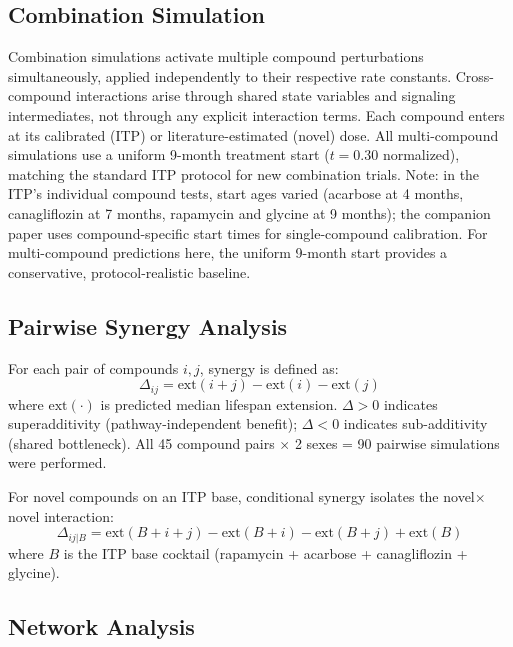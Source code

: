 \documentclass[11pt]{article}
\begin{document}
\subsection{Combination Simulation}

Combination simulations activate multiple compound perturbations simultaneously, applied independently to their respective rate constants. Cross-compound interactions arise through shared state variables and signaling intermediates, not through any explicit interaction terms. Each compound enters at its calibrated (ITP) or literature-estimated (novel) dose. All multi-compound simulations use a uniform 9-month treatment start ($t = 0.30$ normalized), matching the standard ITP protocol for new combination trials. Note: in the ITP's individual compound tests, start ages varied (acarbose at 4 months, canagliflozin at 7 months, rapamycin and glycine at 9 months); the companion paper \citep{Biggs2025elm} uses compound-specific start times for single-compound calibration. For multi-compound predictions here, the uniform 9-month start provides a conservative, protocol-realistic baseline.

\subsection{Pairwise Synergy Analysis}

For each pair of compounds $i, j$, synergy is defined as:
\begin{equation}
\Delta_{ij} = \text{ext}(i{+}j) - \text{ext}(i) - \text{ext}(j)
\label{eq:synergy}
\end{equation}
where $\text{ext}(\cdot)$ is predicted median lifespan extension. $\Delta > 0$ indicates superadditivity (pathway-independent benefit); $\Delta < 0$ indicates sub-additivity (shared bottleneck). All 45 compound pairs $\times$ 2 sexes = 90 pairwise simulations were performed.

For novel compounds on an ITP base, conditional synergy isolates the novel$\times$novel interaction:
\begin{equation}
\Delta_{ij|B} = \text{ext}(B{+}i{+}j) - \text{ext}(B{+}i) - \text{ext}(B{+}j) + \text{ext}(B)
\end{equation}
where $B$ is the ITP base cocktail (rapamycin + acarbose + canagliflozin + glycine).

\subsection{Network Analysis}
\end{document}
